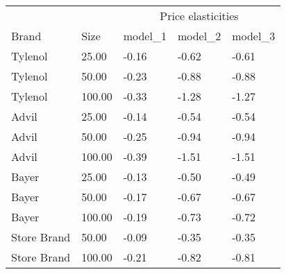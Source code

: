 \begin{table}
\centering
\begin{tabular}[t]{lllll}
\toprule
\multicolumn{2}{c}{ } & \multicolumn{3}{c}{Price elasticities} \\
\cmidrule(l{3pt}r{3pt}){3-5}
Brand & Size & model_1 & model_2 & model_3\\
\midrule
Tylenol & 25.00 & -0.16 & -0.62 & -0.61\\
Tylenol & 50.00 & -0.23 & -0.88 & -0.88\\
Tylenol & 100.00 & -0.33 & -1.28 & -1.27\\
Advil & 25.00 & -0.14 & -0.54 & -0.54\\
Advil & 50.00 & -0.25 & -0.94 & -0.94\\
Advil & 100.00 & -0.39 & -1.51 & -1.51\\
Bayer & 25.00 & -0.13 & -0.50 & -0.49\\
Bayer & 50.00 & -0.17 & -0.67 & -0.67\\
Bayer & 100.00 & -0.19 & -0.73 & -0.72\\
Store Brand & 50.00 & -0.09 & -0.35 & -0.35\\
Store Brand & 100.00 & -0.21 & -0.82 & -0.81\\
\bottomrule
\end{tabular}
\end{table}

